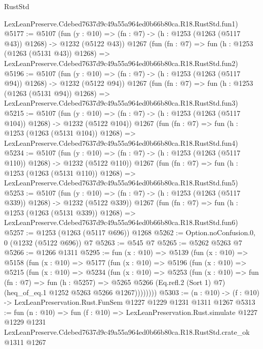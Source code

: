 \begin{lexlean}{RustStd}
\begin{coremodule}
    LexLeanPreserve.Cdebed7637d9c49a55a964ed0b66b80ca.R18.RustStd.fun1)
@5177 := @5107
    (fun (y : @10) => (fn : @7) -> (h : @1253 (@1263 (@5117 @43)) @1268) -> @1232 (@5122 @43))
    @1267
    (fun (fn : @7) =>
    fun (h : @1253 (@1263 (@5131 @43)) @1268) =>
    LexLeanPreserve.Cdebed7637d9c49a55a964ed0b66b80ca.R18.RustStd.fun2)
@5196 := @5107
    (fun (y : @10) => (fn : @7) -> (h : @1253 (@1263 (@5117 @94)) @1268) -> @1232 (@5122 @94))
    @1267
    (fun (fn : @7) =>
    fun (h : @1253 (@1263 (@5131 @94)) @1268) =>
    LexLeanPreserve.Cdebed7637d9c49a55a964ed0b66b80ca.R18.RustStd.fun3)
@5215 := @5107
    (fun (y : @10) => (fn : @7) -> (h : @1253 (@1263 (@5117 @104)) @1268) -> @1232 (@5122 @104))
    @1267
    (fun (fn : @7) =>
    fun (h : @1253 (@1263 (@5131 @104)) @1268) =>
    LexLeanPreserve.Cdebed7637d9c49a55a964ed0b66b80ca.R18.RustStd.fun4)
@5234 := @5107
    (fun (y : @10) => (fn : @7) -> (h : @1253 (@1263 (@5117 @110)) @1268) -> @1232 (@5122 @110))
    @1267
    (fun (fn : @7) =>
    fun (h : @1253 (@1263 (@5131 @110)) @1268) =>
    LexLeanPreserve.Cdebed7637d9c49a55a964ed0b66b80ca.R18.RustStd.fun5)
@5253 := @5107
    (fun (y : @10) => (fn : @7) -> (h : @1253 (@1263 (@5117 @339)) @1268) -> @1232 (@5122 @339))
    @1267
    (fun (fn : @7) =>
    fun (h : @1253 (@1263 (@5131 @339)) @1268) =>
    LexLeanPreserve.Cdebed7637d9c49a55a964ed0b66b80ca.R18.RustStd.fun6)
@5257 := @1253 (@1263 (@5117 @696)) @1268
@5262 := Option.noConfusion.{0, 0} (@1232 (@5122 @696)) @7
@5263 := @545 @7
@5265 := @5262 @5263 @7
@5266 := @1266 @1311
@5295 := fun (x : @10) =>
  @5139
    (fun (x : @10) =>
    @5158
      (fun (x : @10) =>
      @5177
        (fun (x : @10) =>
        @5196
          (fun (x : @10) =>
          @5215
            (fun (x : @10) =>
            @5234
              (fun (x : @10) =>
              @5253
                (fun (x : @10) =>
                fun (fn : @7) =>
                fun (h : @5257) =>
                @5265 @5266 (Eq.refl.{2} (Sort 1) @7) (heq_of_eq.{1} @1252 @5263 @5266 @1267))))))))
@5303 := (n : @10) -> (f : @10) -> LexLeanPreservation.Rust.FunSem @1227 @1229 @1231 @1311 @1267
@5313 := fun (n : @10) =>
  fun (f : @10) =>
  LexLeanPreservation.Rust.simulate
    @1227
    @1229
    @1231
    LexLeanPreserve.Cdebed7637d9c49a55a964ed0b66b80ca.R18.RustStd.crate_ok
    @1311
    @1267
\end{coremodule}
\end{lexlean}

